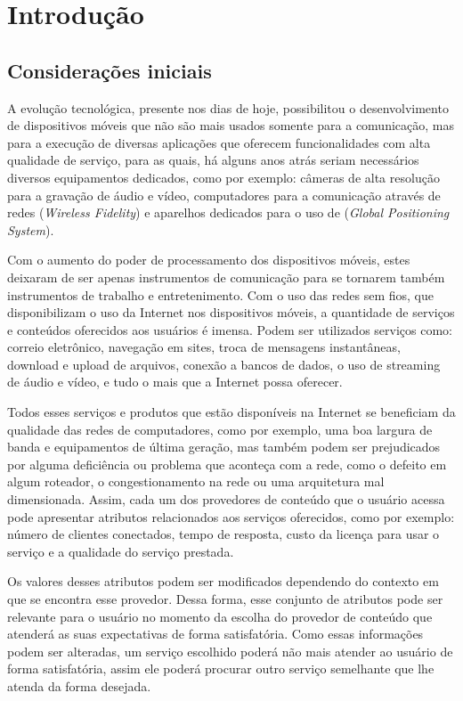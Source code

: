 \chapter{Introdução}\label{cha:introducao}
\section{Considerações iniciais}
A evolução tecnológica, presente nos dias de hoje, possibilitou o desenvolvimento de dispositivos móveis que não são mais usados somente para a comunicação, mas para a execução de diversas aplicações que oferecem funcionalidades com alta qualidade de serviço, para as quais, há alguns anos atrás seriam necessários diversos equipamentos dedicados, como por exemplo: câmeras de alta resolução para a gravação de áudio e vídeo, computadores para a comunicação através de redes  (\textit{Wireless Fidelity}) e aparelhos dedicados para o uso de  (\textit{Global Positioning System}).

Com o aumento do poder de processamento dos dispositivos móveis, estes deixaram de ser apenas instrumentos de comunicação para se tornarem também instrumentos de trabalho e entretenimento.
Com o uso das redes sem fios, que disponibilizam o uso da Internet nos dispositivos móveis, a quantidade de serviços e conteúdos oferecidos aos usuários é imensa. Podem ser utilizados serviços como: correio eletrônico, navegação em sites, troca de mensagens instantâneas, download e upload de arquivos, conexão a bancos de dados, o uso de streaming de áudio e vídeo, e tudo o mais que a Internet possa oferecer.

Todos esses serviços e produtos que estão disponíveis na Internet se beneficiam da qualidade das redes de computadores, como por exemplo, uma boa largura de banda e equipamentos de última geração, mas também podem ser prejudicados por alguma deficiência ou problema que aconteça com a rede, como o defeito em algum roteador, o congestionamento na rede ou uma arquitetura mal dimensionada. Assim, cada um dos provedores de conteúdo que o usuário acessa pode apresentar atributos relacionados aos serviços oferecidos, como por exemplo: número de clientes conectados, tempo de resposta, custo da licença para usar o serviço e a qualidade do serviço prestada.

Os valores desses atributos podem ser modificados dependendo do contexto em que se encontra esse provedor. Dessa forma, esse conjunto de atributos pode ser relevante para o usuário no momento da escolha do provedor de conteúdo que atenderá as suas expectativas de forma satisfatória. Como essas informações podem ser alteradas, um serviço escolhido poderá não mais atender ao usuário de forma satisfatória, assim ele poderá procurar outro serviço semelhante que lhe atenda da forma desejada.

